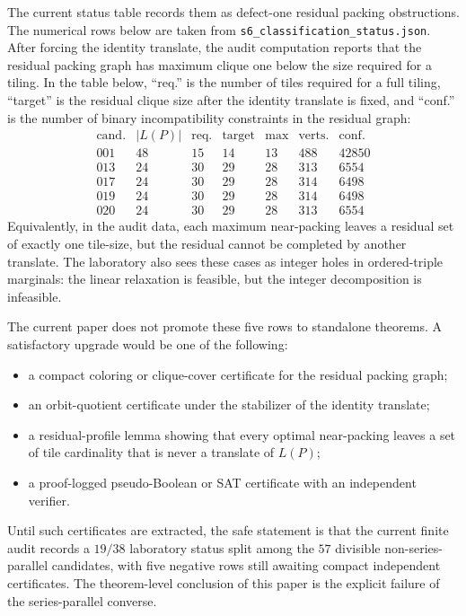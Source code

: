 The current status table records them as defect-one residual packing
obstructions.  The numerical rows below are taken from
\texttt{s6\_classification\_status.json}.  After forcing the identity
translate, the audit computation
reports that the residual packing graph has maximum clique one below the
size required for a tiling.  In the table below, ``req.'' is the number of
tiles required for a full tiling,
``target'' is the residual clique size after the identity translate is
fixed, and ``conf.'' is the number of binary incompatibility constraints in
the residual graph:
\[
\begin{array}{c|rrrrrr}
\text{cand.} & |L(P)| & \text{req.} &
\text{target} & \text{max} & \text{verts.} & \text{conf.}\\
\hline
001 & 48 & 15 & 14 & 13 & 488 & 42850\\
013 & 24 & 30 & 29 & 28 & 313 & 6554\\
017 & 24 & 30 & 29 & 28 & 314 & 6498\\
019 & 24 & 30 & 29 & 28 & 314 & 6498\\
020 & 24 & 30 & 29 & 28 & 313 & 6554
\end{array}
\]
Equivalently, in the audit data, each maximum near-packing leaves a residual
set of exactly one tile-size, but the residual cannot be completed by another
translate.
The laboratory also sees these cases as integer holes in ordered-triple
marginals: the linear relaxation is feasible, but the integer decomposition
is infeasible.

The current paper does not promote these five rows to standalone theorems.
A satisfactory upgrade would be one of the following:

\begin{itemize}
\item a compact coloring or clique-cover certificate for the residual
      packing graph;
\item an orbit-quotient certificate under the stabilizer of the identity
      translate;
\item a residual-profile lemma showing that every optimal near-packing
      leaves a set of tile cardinality that is never a translate of $L(P)$;
\item a proof-logged pseudo-Boolean or SAT certificate with an independent
      verifier.
\end{itemize}

Until such certificates are extracted, the safe statement is that the
current finite audit records a $19/38$ laboratory status split among the
$57$ divisible non-series-parallel candidates, with five negative rows
still awaiting compact independent certificates.  The theorem-level
conclusion of this paper is the explicit failure of the series-parallel
converse.
